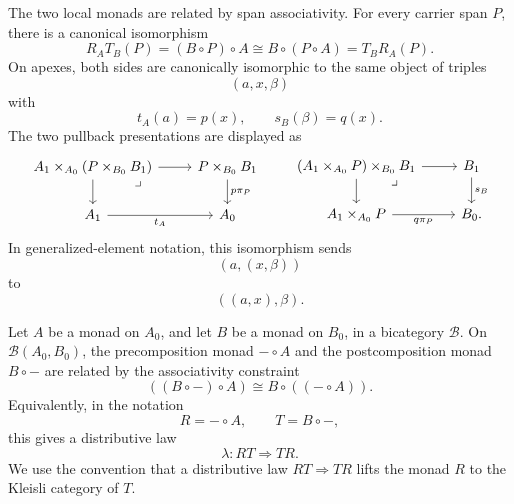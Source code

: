The two local monads are related by span associativity. For every carrier span \(P\), there is a canonical isomorphism
\[
    R_A T_B(P)
    =
    (B\circ P)\circ A
    \cong
    B\circ(P\circ A)
    =
    T_B R_A(P).
\]
On apexes, both sides are canonically isomorphic to the same object of triples
\[
    (a,x,\beta)
\]
with
\[
    t_A(a)=p(x),
    \qquad
    s_B(\beta)=q(x).
\]
The two pullback presentations are displayed as
\[
    \begin{tikzcd}
            A_1\times_{A_0}(P\times_{B_0}B_1)
                \arrow[r]
                \arrow[d]
                \arrow[dr, phantom, "\lrcorner", very near start]
        &
            P\times_{B_0}B_1
                \arrow[d, "p\pi_P"]
        \\
            A_1
                \arrow[r, "t_A"']
        &
            A_0
    \end{tikzcd}
    \qquad
    \begin{tikzcd}
            (A_1\times_{A_0}P)\times_{B_0}B_1
                \arrow[r]
                \arrow[d]
                \arrow[dr, phantom, "\lrcorner", very near start]
        &
            B_1
                \arrow[d, "s_B"]
        \\
            A_1\times_{A_0}P
                \arrow[r, "q\pi_P"']
        &
            B_0.
    \end{tikzcd}
\]
In generalized-element notation, this isomorphism sends
\[
    (a,(x,\beta))
\]
to
\[
    ((a,x),\beta).
\]

\begin{lemma}
\label{lem:endpoint-distributive-law}
    Let \(A\) be a monad on \(A_0\), and let \(B\) be a monad on \(B_0\), in a bicategory \(\mathcal B\). On \(\mathcal B(A_0,B_0)\), the precomposition monad \(-\circ A\) and the postcomposition monad \(B\circ-\) are related by the associativity constraint
    \[
        ((B\circ -)\circ A)
        \cong
        B\circ((-\circ A)).
    \]
    Equivalently, in the notation
    \[
        R=-\circ A,
        \qquad
        T=B\circ-,
    \]
    this gives a distributive law
    \[
        \lambda:RT\Rightarrow TR.
    \]
    We use the convention that a distributive law \(RT\Rightarrow TR\) lifts the monad \(R\) to the Kleisli category of \(T\).
\end{lemma}

